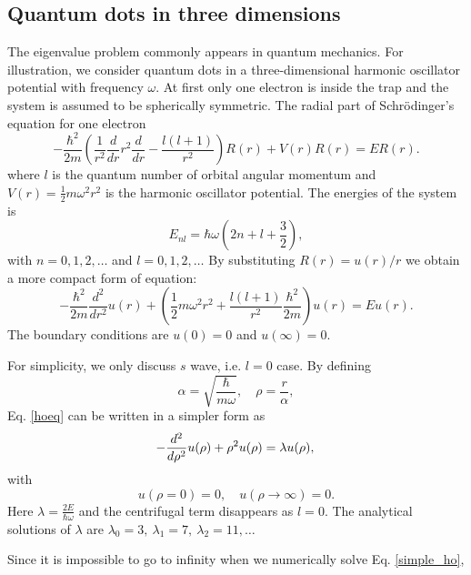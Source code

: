 \documentclass{article}
\begin{document}
	\subsection{Quantum dots in three dimensions}
The eigenvalue problem commonly appears in quantum mechanics. 
For illustration, we consider quantum dots in a three-dimensional harmonic oscillator potential with frequency $\omega$. 
At first only one electron is inside the trap and the system is assumed to be spherically symmetric. 
The radial part of Schr\"{o}dinger's equation for one electron 
\begin{equation}
-\frac{\hbar^2}{2 m} \left ( \frac{1}{r^2} \frac{d}{dr} r^2
\frac{d}{dr} - \frac{l (l + 1)}{r^2} \right )R(r) 
+ V(r) R(r) = E R(r).
\end{equation}
where $l$ is the quantum number of orbital angular momentum and $V(r)=\frac{1}{2}m\omega^2 r^2$ is the harmonic oscillator potential. 
The energies of the system is 
\begin{equation}
E_{nl}=  \hbar \omega \left(2n+l+\frac{3}{2}\right),
\end{equation}
with $n=0,1,2,\dots$ and $l=0,1,2,\dots$
By substituting $R(r) = u(r)/r$ we obtain a more compact form of equation: 
\begin{equation}\label{hoeq}
-\frac{\hbar^2}{2 m} \frac{d^2}{dr^2} u(r) 
+ \left ( \frac{1}{2}m\omega^2 r^2 + \frac{l (l + 1)}{r^2}\frac{\hbar^2}{2 m}
\right ) u(r)  = E u(r) .
\end{equation}
The boundary conditions are $u(0)=0$ and $u(\infty)=0$.
\par
For simplicity, we only discuss $s$ wave, i.e. $l=0$ case. 
By defining 
\begin{equation*}
\alpha=\sqrt{\frac{\hbar}{m\omega}},\quad \rho=\frac{r}{\alpha},
\end{equation*}
Eq. \ref{hoeq} can be written in a simpler form as
\begin{equation}\label{simple_ho}
  -\frac{d^2}{d\rho^2} u(\rho) + \rho^2u(\rho)  = \lambda u(\rho), \\
\end{equation}
with
\begin{equation*}
  u(\rho=0)=0,\quad u(\rho\rightarrow\infty)=0. 
\end{equation*} 
Here $\lambda=\frac{2E}{\hbar\omega}$ and the centrifugal term disappears as $l=0$. 
The analytical solutions of $\lambda$ are $\lambda_0=3,\ \lambda_1=7,\ \lambda_2=11,\dots$
\par
Since it is impossible to go to infinity when we numerically solve Eq. \ref{simple_ho}, 
\end{document}
